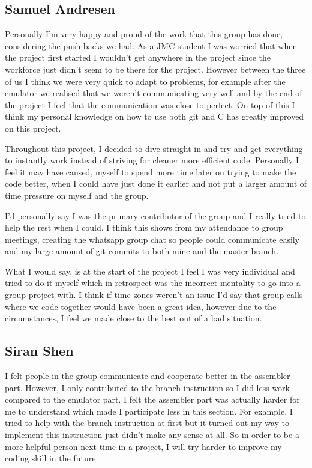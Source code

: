 \documentclass{article}
\begin{document}
\subsection*{Samuel Andresen}
Personally I'm very happy and proud of the work that this group has done, considering the push backs we had. As a JMC student I was worried that when the project first started I wouldn't get anywhere in the project since the workforce just didn't seem to be there for the project. However between the three of us I think we were very quick to adapt to problems, for example after the emulator we realised that we weren't communicating very well and by the end of the project I feel that the communication was close to perfect. On top of this I think my personal knowledge on how to use both git and C has greatly improved on this project.

Throughout this project, I decided to dive straight in and try and get everything to instantly work instead of striving for cleaner more efficient code. Personally I feel it may have caused, myself to spend more time later on trying to make the code better, when I could have just done it earlier and not put a larger amount of time pressure on myself and the group.

I'd personally say I was the primary contributor of the group and I really tried to help the rest when I could. I think this shows from my attendance to group meetings, creating the whatsapp group chat so people could communicate easily and my large amount of git commits to both mine and the master branch.

What I would say, is at the start of the project I feel I was very individual and tried to do it myself which in retrospect was the incorrect mentality to go into a group project with. I think if time zones weren't an issue I'd say that group calls where we code together would have been a great idea, however due to the circumstances, I feel we made close to the best out of a bad situation.

\subsection*{Siran Shen}
I felt people in the group communicate and cooperate better in the assembler part. However, I only contributed to the branch instruction so I did less work compared to the emulator part. I felt the assembler part was actually harder for me to understand which made I participate less in this section. For example, I tried to help with the branch instruction at first but it turned out my way to implement this instruction just didn't make any sense at all. So in order to be a more helpful person next time in a project, I will try harder to improve my coding skill in the future.
\end{document}

